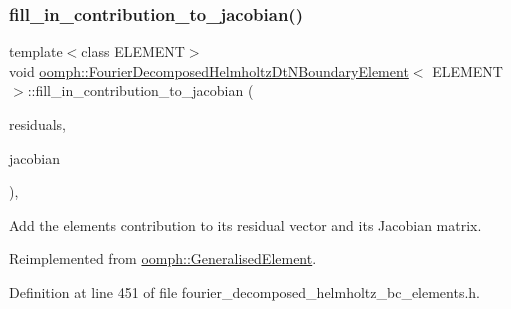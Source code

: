 \subsubsection{\texorpdfstring{fill\+\_\+in\+\_\+contribution\+\_\+to\+\_\+jacobian()}{fill\_in\_contribution\_to\_jacobian()}}
{\footnotesize\ttfamily template$<$class E\+L\+E\+M\+E\+NT$>$ \\
void \hyperlink{classoomph_1_1FourierDecomposedHelmholtzDtNBoundaryElement}{oomph\+::\+Fourier\+Decomposed\+Helmholtz\+Dt\+N\+Boundary\+Element}$<$ E\+L\+E\+M\+E\+NT $>$\+::fill\+\_\+in\+\_\+contribution\+\_\+to\+\_\+jacobian (\begin{DoxyParamCaption}\item[{\hyperlink{classoomph_1_1Vector}{Vector}$<$ double $>$ \&}]{residuals,  }\item[{\hyperlink{classoomph_1_1DenseMatrix}{Dense\+Matrix}$<$ double $>$ \&}]{jacobian }\end{DoxyParamCaption})\hspace{0.3cm}{\ttfamily [inline]}, {\ttfamily [virtual]}}



Add the element\textquotesingle{}s contribution to its residual vector and its Jacobian matrix. 



Reimplemented from \hyperlink{classoomph_1_1GeneralisedElement_a6ae09fc0d68e4309ac1b03583d252845}{oomph\+::\+Generalised\+Element}.



Definition at line 451 of file fourier\+\_\+decomposed\+\_\+helmholtz\+\_\+bc\+\_\+elements.\+h.

\mbox{\label{classoomph_1_1FourierDecomposedHelmholtzDtNBoundaryElement_a7cc11232d6c849efc10bc683d047126c}} 
